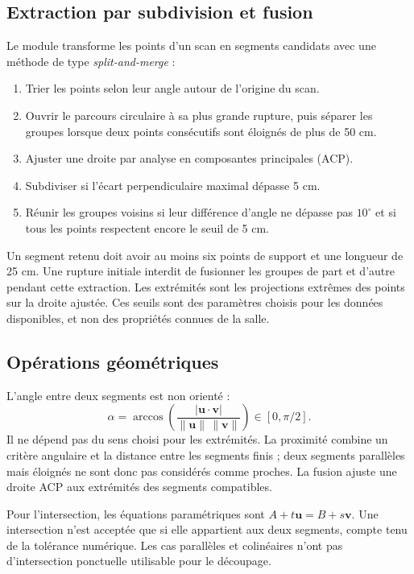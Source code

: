 \documentclass[11pt,a4paper]{article}
\newcommand{\code}[1]{\texttt{\detokenize{#1}}}
\begin{document}
\subsection{Extraction par subdivision et fusion}
Le module \code{segments.py} transforme les points d'un scan en segments
candidats avec une méthode de type \emph{split-and-merge} :
\begin{enumerate}[nosep]
\item Trier les points selon leur angle autour de l'origine du scan.
\item Ouvrir le parcours circulaire à sa plus grande rupture, puis séparer
les groupes lorsque deux points consécutifs sont éloignés de plus de 50 cm.
\item Ajuster une droite par analyse en composantes principales (ACP).
\item Subdiviser si l'écart perpendiculaire maximal dépasse 5 cm.
\item Réunir les groupes voisins si leur différence d'angle ne dépasse pas
$10^\circ$ et si tous les points respectent encore le seuil de 5 cm.
\end{enumerate}
Un segment retenu doit avoir au moins six points de support et une longueur
de 25 cm. Une rupture initiale interdit de fusionner les groupes de part et
d'autre pendant cette extraction. Les extrémités sont les projections
extrêmes des points sur la droite ajustée. Ces seuils sont des paramètres
choisis pour les données disponibles, et non des propriétés connues de la salle.

\subsection{Opérations géométriques}
L'angle entre deux segments est non orienté :
\[
 \alpha=\arccos\!\left(
 \frac{|\mathbf u\cdot\mathbf v|}{\|\mathbf u\|\,\|\mathbf v\|}
 \right)\in[0,\pi/2].
\]
Il ne dépend pas du sens choisi pour les extrémités. La proximité combine
un critère angulaire et la distance entre les segments finis ; deux
segments parallèles mais éloignés ne sont donc pas considérés comme proches.
La fusion ajuste une droite ACP aux extrémités des segments compatibles.

Pour l'intersection, les équations paramétriques sont
$A+t\mathbf u=B+s\mathbf v$. Une intersection n'est acceptée que si elle
appartient aux deux segments, compte tenu de la tolérance numérique.
Les cas parallèles et colinéaires n'ont pas d'intersection ponctuelle
utilisable pour le découpage.
\end{document}
